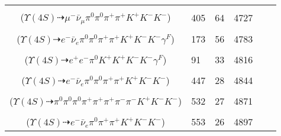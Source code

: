 \documentclass[landscape]{article}
\newcounter{rownumbers}
\newcommand\rn{\stepcounter{rownumbers}\arabic{rownumbers}}
\newcommand{\EOL}{\\} %
\newcommand{\topoTags}[1]{#1} %
\begin{document}
\begin{longtable}{clcccc}
\rn & \makecell[l]{ $ 
\Upsilon(4S) \rightarrow B^{0} \bar{B}^{0} ,
B^{0} \rightarrow \pi^{0} K^{+} K^{-} ,
\bar{B}^{0} \rightarrow \mu^{-} \bar{\nu}_{\mu} D^{*+} ,
D^{*+} \rightarrow \pi^{+} D^{0} ,
D^{0} \rightarrow \pi^{0} \pi^{+} K^{-} 
$ \\ ($
\Upsilon(4S) \dashrightarrow \mu^{-} \bar{\nu}_{\mu} \pi^{0} \pi^{0} \pi^{+} \pi^{+} K^{+} K^{-} K^{-} 
$) } & \topoTags{405 & }64 & 4727 \EOL

\rn & \makecell[l]{ $ 
\Upsilon(4S) \rightarrow B^{0} \bar{B}^{0} ,
B^{0} \rightarrow \pi^{0} K^{+} K^{-} ,
\bar{B}^{0} \rightarrow e^{-} \bar{\nu}_{e} D^{*+} \gamma^{F} ,
D^{*+} \rightarrow \pi^{+} D^{0} ,
D^{0} \rightarrow \pi^{0} \pi^{+} K^{-} 
$ \\ ($
\Upsilon(4S) \dashrightarrow e^{-} \bar{\nu}_{e} \pi^{0} \pi^{0} \pi^{+} \pi^{+} K^{+} K^{-} K^{-} \gamma^{F} 
$) } & \topoTags{173 & }56 & 4783 \EOL

\rn & \makecell[l]{ $ 
\Upsilon(4S) \rightarrow B^{0} B^{0} ,
B^{0} \rightarrow \pi^{0} K^{+} K^{-} ,
B^{0} \rightarrow \pi^{0} K^{+} K^{-} ,
\pi^{0} \rightarrow e^{+} e^{-} \gamma^{F} 
$ \\ ($
\Upsilon(4S) \dashrightarrow e^{+} e^{-} \pi^{0} K^{+} K^{+} K^{-} K^{-} \gamma^{F} 
$) } & \topoTags{91 & }33 & 4816 \EOL

\rn & \makecell[l]{ $ 
\Upsilon(4S) \rightarrow B^{0} \bar{B}^{0} ,
B^{0} \rightarrow \pi^{0} K^{+} K^{-} ,
\bar{B}^{0} \rightarrow e^{-} \bar{\nu}_{e} D^{*+} ,
D^{*+} \rightarrow \pi^{0} D^{+} ,
D^{+} \rightarrow \pi^{+} \pi^{+} K^{-} 
$ \\ ($
\Upsilon(4S) \dashrightarrow e^{-} \bar{\nu}_{e} \pi^{0} \pi^{0} \pi^{+} \pi^{+} K^{+} K^{-} K^{-} 
$) } & \topoTags{447 & }28 & 4844 \EOL

\rn & \makecell[l]{ $ 
\Upsilon(4S) \rightarrow B^{0} \bar{B}^{0} ,
B^{0} \rightarrow \pi^{0} K^{+} K^{-} ,
\bar{B}^{0} \rightarrow \pi^{0} \pi^{+} \pi^{-} \pi^{-} D^{*+} ,
D^{*+} \rightarrow \pi^{+} D^{0} ,
D^{0} \rightarrow \pi^{0} \pi^{+} K^{-} 
$ \\ ($
\Upsilon(4S) \dashrightarrow \pi^{0} \pi^{0} \pi^{0} \pi^{+} \pi^{+} \pi^{+} \pi^{-} \pi^{-} K^{+} K^{-} K^{-} 
$) } & \topoTags{532 & }27 & 4871 \EOL

\rn & \makecell[l]{ $ 
\Upsilon(4S) \rightarrow B^{0} \bar{B}^{0} ,
B^{0} \rightarrow \pi^{0} K^{+} K^{-} ,
\bar{B}^{0} \rightarrow e^{-} \bar{\nu}_{e} D^{*+} ,
D^{*+} \rightarrow \pi^{+} D^{0} ,
D^{0} \rightarrow \pi^{+} K^{-} 
$ \\ ($
\Upsilon(4S) \dashrightarrow e^{-} \bar{\nu}_{e} \pi^{0} \pi^{+} \pi^{+} K^{+} K^{-} K^{-} 
$) } & \topoTags{553 & }26 & 4897 \EOL


\end{longtable}
\end{document}
